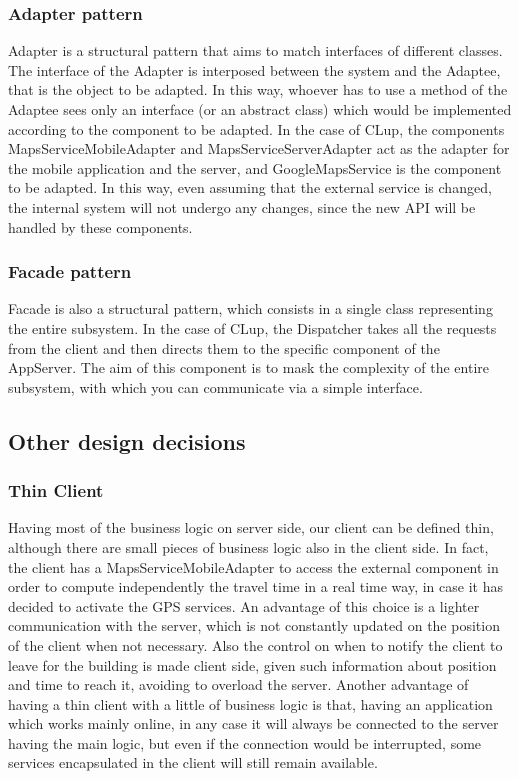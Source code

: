 \subsubsection{Adapter pattern}
Adapter is a structural pattern that aims to match interfaces of different classes. The interface of the Adapter is interposed between the system and the Adaptee, that is the object to be adapted. In this way, whoever has to use a method of the Adaptee sees only an interface (or an abstract class) which would be implemented according to the component to be adapted. In the case of CLup, the components MapsServiceMobileAdapter and MapsServiceServerAdapter act as the adapter for the mobile application and the server, and GoogleMapsService is the component to be adapted. In this way, even assuming that the external service is changed, the internal system will not undergo any changes, since the new API will be handled by these components.\\
\subsubsection{Facade pattern}
Facade is also a structural pattern, which consists in a single class representing the entire subsystem. In the case of CLup, the Dispatcher takes all the requests from the client and then directs them to the specific component of the AppServer. The aim of this component is to mask the complexity of the entire subsystem, with which you can communicate via a simple interface.
\newpage
\subsection {Other design decisions}
\subsubsection{Thin Client}
Having most of the business logic on server side, our client can be defined thin, although there are small pieces of business logic also in the client side. In fact, the client has a MapsServiceMobileAdapter to access the external component in order to compute independently the travel time in a real time way, in case it has decided to activate the GPS services. An advantage of this choice is a lighter communication with the server, which is not constantly updated on the position of the client when not necessary. Also the control on when to notify the client to leave for the building is made client side, given such information about position and time to reach it, avoiding to overload the server.
Another advantage of having a thin client with a little of business logic is that, having an application which works mainly online, in any case it will always be connected to the server having the main logic, but even if the connection would be interrupted, some services encapsulated in the client will still remain available.
